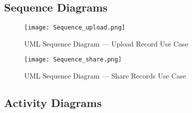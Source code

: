 \FloatBarrier{}
\clearpage



\subsection{Sequence Diagrams}
\begin{figure}[htbp]
    \centering
    \texttt{[image: Sequence\_upload.png]}
    \caption{UML Sequence Diagram --- Upload Record Use Case}\label{fig:sequence1}
\end{figure}

\begin{figure}[htbp]
    \centering
    \texttt{[image: Sequence\_share.png]}
    \caption{UML Sequence Diagram --- Share Records Use Case}\label{fig:sequence2}
\end{figure}

\FloatBarrier{}

\noindent\begin{minipage}{\textwidth}
    \subsection{Activity Diagrams}
    \begin{center}
        \label{fig:activity1}
    \end{center}
\end{minipage}

\noindent\begin{minipage}{\textwidth}
    \begin{center}
        \label{fig:activity2}
    \end{center}
\end{minipage}

